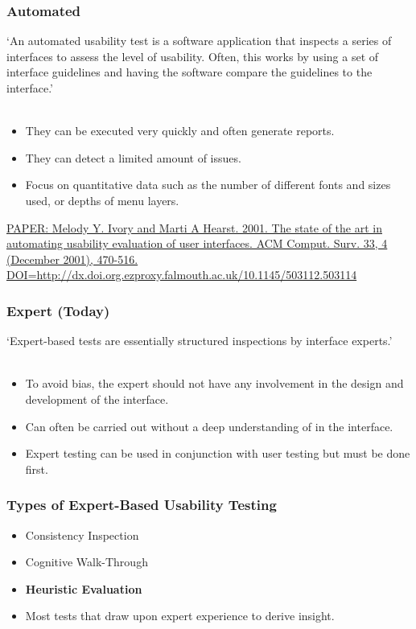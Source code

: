 \begin{frame}
	\frametitle{Automated}
	
	`An automated usability test is a software application that inspects a series of interfaces to assess the level of usability. Often, this works by using a set of interface guidelines and having the software compare the guidelines to the interface.' \\~\\
	
	\begin{itemize}
		\item They can be executed very quickly and often generate reports.  
		\item They can detect a limited amount of issues. 
		\item Focus on quantitative data such as the number of different fonts and sizes used, or depths of menu layers. 
	\end{itemize}
		
	\tiny {\href{https://dl-acm-org.ezproxy.falmouth.ac.uk/citation.cfm?id=503114}{PAPER: Melody Y. Ivory and Marti A Hearst. 2001. The state of the art in automating usability evaluation of user interfaces. ACM Comput. Surv. 33, 4 (December 2001), 470-516. DOI=http://dx.doi.org.ezproxy.falmouth.ac.uk/10.1145/503112.503114}}
\end{frame}

\begin{frame}
	\frametitle{Expert (Today) }
	
	`Expert-based tests are essentially structured inspections by interface experts.' \\~\\
	
	\begin{itemize}
		\item To avoid bias, the expert should not have any involvement in the design and development of the interface. 
		\item Can often be carried out without a deep understanding of  in the interface.
		\item Expert testing can be used in conjunction with user testing but must be done first. 
	\end{itemize}
		
\end{frame}

\begin{frame}
	\frametitle{Types of Expert-Based Usability Testing}
		
	\begin{itemize}
		\item Consistency Inspection
		\item Cognitive Walk-Through
		\item \textbf{Heuristic Evaluation}
		\item Most tests that draw upon expert experience to derive insight.
	\end{itemize}
		
\end{frame}


